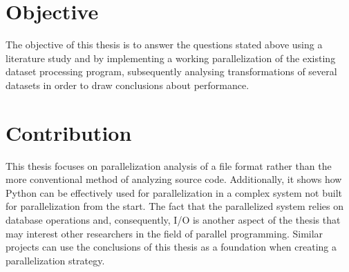 \section{Objective}
The objective of this thesis is to answer the questions stated above using a literature study and by implementing a working parallelization
of the existing dataset processing program, subsequently analysing transformations of several datasets in order to draw conclusions about performance.

\section{Contribution}
This thesis focuses on parallelization analysis of a file format rather than the more conventional method of analyzing source code. Additionally,
it shows how Python can be effectively used for parallelization in a complex system not built for parallelization from the start. The fact that
the parallelized system relies on database operations and, consequently, I/O is another aspect of the thesis that may interest other researchers
in the field of parallel programming. Similar projects can use the conclusions of this thesis as a foundation when creating a parallelization strategy.
